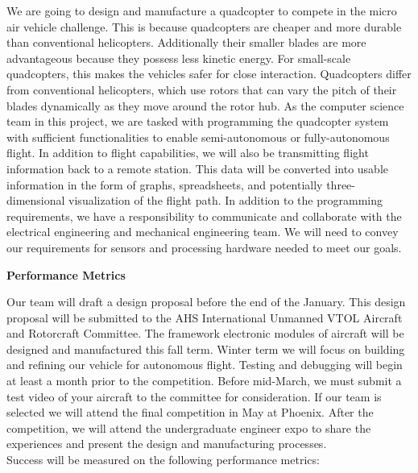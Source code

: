 \documentclass[10pt,letterpaper,onecolumn]{article}
\begin{document}
We are going to design and manufacture a quadcopter to compete in the micro air vehicle challenge. This is because quadcopters are cheaper and more durable than conventional helicopters. Additionally their smaller blades are more advantageous because they possess less kinetic energy. For small-scale quadcopters, this makes the vehicles safer for close interaction. Quadcopters differ from conventional helicopters, which use rotors that can vary the pitch of their blades dynamically as they move around the rotor hub. As the computer science team in this project, we are tasked with programming the quadcopter system with sufficient functionalities to enable semi-autonomous or fully-autonomous flight. In addition to flight capabilities, we will also be transmitting flight information back to a remote station. This data will be converted into usable information in the form of graphs, spreadsheets, and potentially three-dimensional visualization of the flight path. In addition to the programming requirements, we have a responsibility to communicate and collaborate with the electrical engineering and mechanical engineering team. We will need to convey our requirements for sensors and processing hardware needed to meet our goals.\\

\begin{center}
\large
\textbf{Performance Metrics}
\end{center}

Our team will draft a design proposal before the end of the January. This design proposal will be submitted to the AHS International Unmanned VTOL Aircraft and Rotorcraft Committee. The framework electronic modules of aircraft will be designed and manufactured this fall term. Winter term we will focus on building and refining our vehicle for autonomous flight. Testing and debugging will begin at least a month prior to the competition. Before mid-March, we must submit a test video of your aircraft to the committee for consideration. If our team is selected we will attend the final competition in May at Phoenix. After the competition, we will attend the undergraduate engineer expo to share the experiences and present the design and manufacturing processes.\\
Success will be measured on the following performance metrics:
\end{document}
